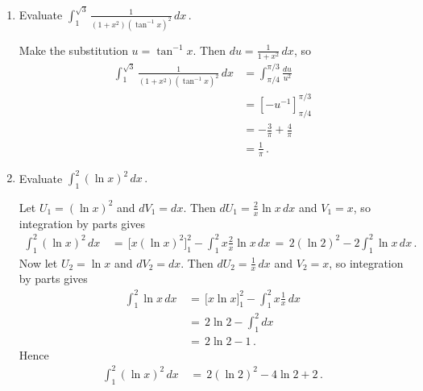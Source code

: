 \documentclass{msi-assignment}
\begin{document}


\begin{question}[Integrals]{10}
\begin{enumerate}


\item Evaluate $\displaystyle{\int_{1}^{\sqrt3}\frac{1}{(1+x^2)(\tan^{-1} x)^2}\,dx\,.}$


\begin{answer}
Make the substitution $u=\tan^{-1}x$. Then $du=\frac{1}{1+x^2}\, dx$, so 
\begin{align*}
\int_{1}^{\sqrt3}\frac{1}{(1+x^2)(\tan^{-1} x)^2}\,dx
  &= \int_{\pi/4}^{\pi/3} \frac{du}{u^{2}} \\[5pt]
  &= \left[-u^{-1}\right]_{\pi/4}^{\pi/3} \\[5pt]
  &= -\frac3\pi+\frac4\pi\\[5pt]
  &=\frac1\pi\,. 
\end{align*}
\end{answer}



\item Evaluate $\displaystyle{\int_1^{2} (\ln x)^2\,dx\,.}$

\begin{answer}
 
Let $U_1=(\ln x)^2$ and $dV_1 = dx$. Then $dU_1 = \frac{2}{x}\ln x\,dx$ and $V_1 = x$, so integration by parts gives
\begin{align*}
\int_1^{2}(\ln x)^2\,dx\,&=\,\bigg[x(\ln x)^2\bigg]_1^2 - \int_1^2 x\tfrac{2}{x}\ln x\,dx\,=\,2(\ln 2)^2 - 2\int_1^2\ln x\,dx\,.
\end{align*}
Now let $U_2=\ln x$ and $dV_2 = dx$. Then $dU_2 = \frac1x\,dx$ and $V_2 = x$, so integration by parts gives
\begin{align*}
\int_1^2\ln x\,dx\,&=\,\bigg[x\ln x\bigg]_1^2 - \int_1^2 x\tfrac1x\,dx\\
&=\,2\ln 2 - \int_1^2 dx\\
&=\,2\ln 2-1\,.
\end{align*}
Hence
\begin{align*}
\int_1^2(\ln x)^2\,dx\,&=\,2(\ln 2)^2 - 4\ln 2+2\,.
\end{align*}


\end{answer}
\end{enumerate}
\end{question}
\end{document}
